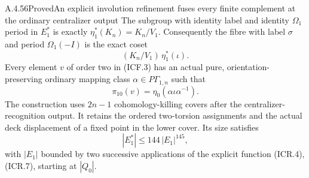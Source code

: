 \begin{result}{A.4.56}{Proved}{An explicit involution refinement fuses every finite complement at the ordinary centralizer output}
The subgroup with identity label and identity $\Omega_1$ period
in $E_1^*$ is exactly $\eta_1^*(K_n)=K_n/V_1$.
Consequently the fibre with label $\sigma$ and period
$\Omega_1(-I)$ is the exact coset
\[
                         (K_n/V_1)\,\eta_1^*(\iota).
                                                               \tag{ICF.3}
\]
Every element $v$ of order two in (ICF.3) has an actual pure,
orientation-preserving ordinary mapping class
$\alpha\in P\Gamma_{1,n}$ such that
\[
                \pi_{10}(v)=\eta_0(\alpha\iota\alpha^{-1}).
                                                               \tag{ICF.4}
\]
The construction uses $2n-1$ cohomology-killing covers after
the centralizer-recognition output.  It retains the ordered
two-torsion assignments and the actual deck displacement of a
fixed point in the lower cover.  Its size satisfies
\[
                         |E_1^*|\leq144\,|E_1|^{145},
                                                               \tag{ICF.5}
\]
with $|E_1|$ bounded by two successive applications of the
explicit function (ICR.4),(ICR.7), starting at $|Q_0|$.
\end{result}

